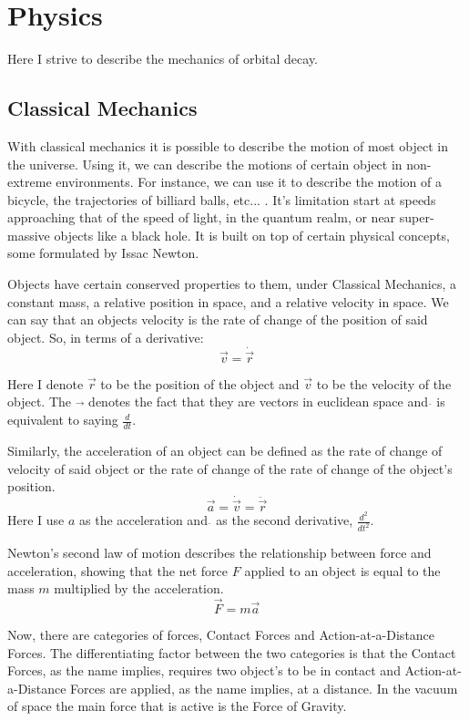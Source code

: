\chapter{Physics}\label{ch:physics}

Here I strive to describe the mechanics of orbital decay.

\section{Classical Mechanics}

With classical mechanics it is possible to describe the motion of most object in the universe. Using it, we can describe the motions of certain object in non-extreme environments. For instance, we can use it to describe the motion of a bicycle, the trajectories of billiard balls, etc... . It's limitation start at speeds approaching that of the speed of light, in the quantum realm, or near super-massive objects like a black hole. It is built on top of certain physical concepts, some formulated by Issac Newton.

Objects have certain conserved properties to them, under Classical Mechanics, a constant mass, a relative position in space, and a relative velocity in space. We can say that an objects velocity is the rate of change of the position of said object. So, in terms of a derivative: $$\vec{v}=\dot{\vec{r}}$$ 

Here I denote $\vec{r}$ to be the position of the object and $\vec{v}$ to be the velocity of the object. The $\vec{}$ denotes the fact that they are vectors in euclidean space and $\dot{}$ is equivalent to saying $\frac{d}{dt}$.

Similarly, the acceleration of an object can be defined as the rate of change of velocity of said object or the rate of change of the rate of change of the object's position. $$\vec{a}=\dot{\vec{v}}=\ddot{\vec{r}}$$ 
Here I use $a$ as the acceleration and $\ddot{}$ as the second derivative, $\frac{d^2}{dt^2}$.

Newton's second law of motion describes the relationship between force and acceleration, showing that the net force $F$ applied to an object is equal to the mass $m$ multiplied by the acceleration. 
\begin{equation}\label{eq:newton}
\vec{F}=m\vec{a}
\end{equation}

Now, there are categories of forces, Contact Forces and Action-at-a-Distance Forces. The differentiating factor between the two categories is that the Contact Forces, as the name implies, requires two object's to be in contact and Action-at-a-Distance Forces are applied, as the name implies, at a distance. In the vacuum of space the main force that is active is the Force of Gravity.

